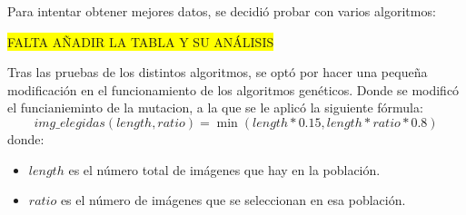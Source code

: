 Para intentar obtener mejores datos, se decidió probar con varios algoritmos:


\colorbox{yellow}{FALTA AÑADIR LA TABLA Y SU ANÁLISIS}

Tras las pruebas de los distintos algoritmos, se optó por hacer una pequeña modificación en el funcionamiento de los
algoritmos genéticos.
Donde se modificó el funcianieminto de la mutacion, a la que se le aplicó la siguiente fórmula:
\[
    img\_elegidas(length, ratio)=\min(length*0.15, length*ratio*0.8)
\]
donde:
\begin{itemize}
    \item $length$ es el número total de imágenes que hay en la población.
    \item $ratio$ es el número de imágenes que se seleccionan en esa población.
\end{itemize}

